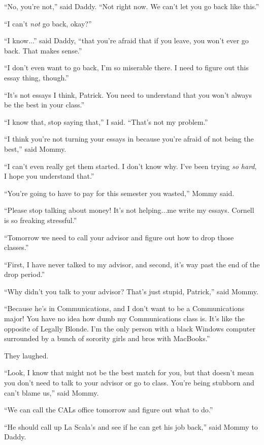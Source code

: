 ``No, you're not,'' said Daddy.  ``Not right now.  We can't let you go back like this.''

``I can't \textit{not} go back, okay?''

``I know...'' said Daddy, ``that you're afraid that if you leave, you won't ever go
back.  That makes sense.''

``I don't even want to go back, I'm so miserable there.  I need to figure out
this essay thing, though.''

``It's not essays I think, Patrick.  You need to understand that you won't always be the
best in your class.''

``I know that, stop saying that,'' I said.  ``That's not my problem.''

``I think you're not turning your essays in because you're afraid of not being
the best,'' said Mommy.

``I can't even really get them started.  I don't know why.  I've been trying
\textit{so hard}, I hope you understand that.''

``You're going to have to pay for this semester you wasted,'' Mommy said.

``Please stop talking about money!  It's not helping...me write my essays.
Cornell is so freaking stressful.''

``Tomorrow we need to call your advisor and figure out how to drop those
classes.''

``First, I have never talked to my advisor, and second, it's way past the end of
the drop period.''

``Why didn't you talk to your advisor?  That's just stupid, Patrick,'' said Mommy.

``Because he's in Communications, and I don't want to be a Communications major!
You have no idea how dumb my Communications class is.  It's like the opposite of
Legally Blonde.  I'm the only person with a black Windows computer surrounded by
a bunch of sorority girls and bros with MacBooks.''

They laughed.

``Look, I know that might not be the best match for you, but that doesn't mean
you don't need to talk to your advisor or go to class.  You're being stubborn
and can't blame us,'' said Mommy.

``We can call the CALs office tomorrow and figure out what to do.''

``He should call up La Scala's and see if he can get his job back,'' said Mommy to
Daddy.

